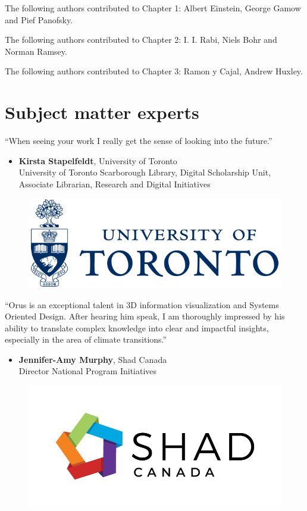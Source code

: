\noindent The following authors contributed to Chapter 1: Albert Einstein, George Gamow and Pief Panofsky.

\noindent The following authors contributed to Chapter 2: I. I. Rabi, Niels Bohr and Norman Ramsey.

\noindent The following authors contributed to Chapter 3: Ramon y Cajal, Andrew Huxley.

\section*{Subject matter experts}
“When seeing your work I really get the sense of looking into the future.”
\begin{itemize}
    \item[] \textbf{Kirsta Stapelfeldt}, University of Toronto \\
University of Toronto Scarborough Library, Digital Scholarship Unit, \\ Associate Librarian, Research and Digital Initiatives \\

\end{itemize}
\begin{figure}[h]
    \centering
    \includegraphics[width=0.3\linewidth]{figures/p4.png}
\end{figure}
\par
“Orus is an exceptional talent in 3D information visualization and Systems Oriented Design. After hearing him speak, I am thoroughly impressed by his ability to translate complex knowledge into clear and impactful insights, especially in the area of climate transitions.”
\begin{itemize}
    \item[] \textbf{Jennifer-Amy Murphy}, Shad Canada \\
	Director National Program Initiatives
\end{itemize}
\vspace{-0.9cm}
\begin{figure}[h!]
    \centering
    \includegraphics[width=0.3\linewidth]{figures/p5.png}
\end{figure}

